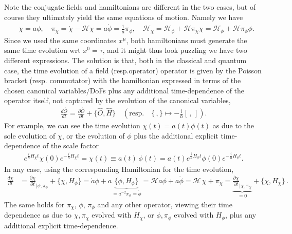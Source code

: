 \documentclass[../QFT_main.tex]{subfiles}
\begin{document}
Note the conjugate fields and hamiltonians are different in the two cases, but of course they ultimately yield the same equations of motion.
Namely we have
\begin{align}
    &\chi=a\phi,\quad \pi_\chi = \dot{\chi} - \mathcal{H} \chi = a \dot{\phi} = \tfrac{1}{a} \pi_\phi,\quad \mathcal{H}_\chi= \mathcal{H}_\phi + \mathcal{H} \pi_\chi \chi = \mathcal{H}_\phi + \mathcal{H} \pi_\phi \phi.
\end{align}
Since we used the same coordinates $x^\mu$, both hamiltonians must generate the same time evolution wrt $x^0=\tau$, and it might thus look puzzling we have two different expressions.
The solution is that, both in the classical and quantum case, the time evolution of a field (resp.operator) operator is given by the Poisson bracket (resp. commutator) with the hamiltonian expressed in terms of the chosen canonical variables/DoFs plus any additional time-dependence of the operator itself, not captured by the evolution of the canonical variables,
\begin{align}
    \frac{d\hat{O}}{dt} = \frac{\partial \hat{O}}{\partial t} + \{\hat{O}, \hat{H}\} \quad \left(\text{resp.}\quad \{\,,\}\mapsto -\tfrac{i}{\hbar}[\,,\,]\right).
\end{align}
For example, we can see the time evolution $\chi(t)=a(t)\phi(t)$ as due to the sole evolution of $\chi$, or the evolution of $\phi$ plus the additional explicit time-dependence of the scale factor
\begin{align}
  e^{\tfrac{i}{h}H_\chi t} \chi(0) e^{-\tfrac{i}{h}H_\chi t} = \chi(t)\equiv a(t)\, \phi(t)= a(t) e^{\tfrac{i}{h}H_\phi t} \phi(0) e^{-\tfrac{i}{h}H_\phi t}.
\end{align}
In any case, using the corresponding Hamiltonian for the time evolution,
\begin{align}
\frac{d\chi}{dt} &= \frac{\partial \chi}{\partial t}_{|\phi,\pi_\phi}\!\!\! + \{\chi, H_\phi\} = \dot{a}\phi + a\underbrace{\{\phi, H_\phi\}}_{=a^{-2}\pi_\phi=\dot{\phi}}  = \mathcal{H} a \phi + a \dot{\phi} = \mathcal{H}\, \chi +\pi_\chi = \underbrace{\frac{\partial \chi}{\partial t}_{|\chi,\pi_\chi}}_{=0} + \{\chi, H_\chi\}\,.
\end{align}
The same holds for $\pi_\chi$, $\phi$, $\pi_\phi$ and any other operator, viewing their time dependence as due to $\chi,\pi_\chi$ evolved with $H_\chi$, or $\phi,\pi_\phi$ evolved with $H_\phi$, plus any additional explicit time-dependence.
\end{document}
